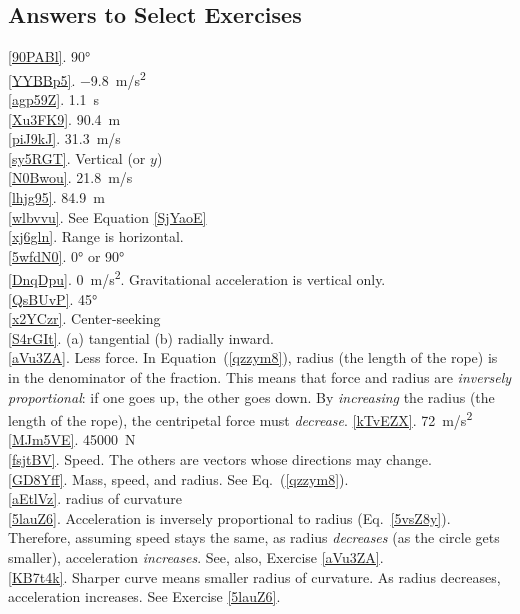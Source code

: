 \documentclass[main.tex]{subfiles}
\begin{document}
\subsection{Answers to Select Exercises}
\ref{90PABl}. \ang{90}\\
\ref{YYBBp5}. \SI{-9.8}{m/s^2}\\
\ref{agp59Z}. \SI{1.1}{s}\\
\ref{Xu3FK9}. \SI{90.4}{m}\\
\ref{piJ9kJ}. \SI{31.3}{m/s}\\
\ref{sy5RGT}. Vertical (or $y$)\\
\ref{N0Bwou}. \SI{21.8}{m/s}\\
\ref{lhjg95}. \SI{84.9}{m}\\
\ref{wlbvvu}. See Equation \eqref{SjYaoE}\\
\ref{xj6gln}. Range is horizontal.\\
\ref{5wfdN0}. \ang{0} or \ang{90}\\
\ref{DnqDpu}. \SI{0}{m/s^2}. Gravitational acceleration is vertical only.\\
\ref{QsBUvP}. \ang{45}\\
\ref{x2YCzr}. Center-seeking\\
\ref{S4rGIt}. (a) tangential \hspace{1em} (b) radially inward.\\
\ref{aVu3ZA}. Less force. In Equation~(\ref{qzzym8}), radius (the length of the rope) is in the denominator of the fraction. This means that force and radius are \textit{inversely proportional}: if one goes up, the other goes down. By \textit{increasing} the radius (the length of the rope), the centripetal force must \textit{decrease}.
\ref{kTvEZX}. \SI{72}{m/s^2}\\
\ref{MJm5VE}. \SI{45000}{N}\\
\ref{fsjtBV}. Speed. The others are vectors whose directions may change.\\
\ref{GD8Yff}. Mass, speed, and radius. See Eq.~(\ref{qzzym8}).\\
\ref{aEtlVz}. radius of curvature\\
\ref{5lauZ6}. Acceleration is inversely proportional to radius (Eq.~\ref{5vsZ8y}). Therefore, assuming speed stays the same, as radius \textit{decreases} (as the circle gets smaller), acceleration \textit{increases}. See, also, Exercise \ref{aVu3ZA}.\\
\ref{KB7t4k}. Sharper curve means smaller radius of curvature. As radius decreases, acceleration increases. See Exercise \ref{5lauZ6}.\\
\end{document}

